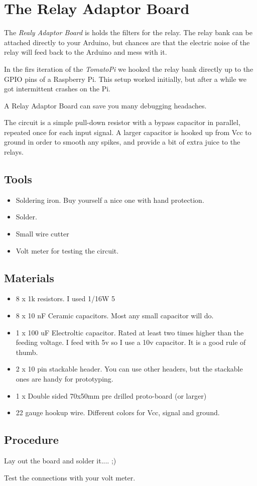 \documentclass{article} \usepackage{multicol}
\begin{document}
\section{The Relay Adaptor Board}
The \textit{Realy Adaptor Board} is holds the filters for the relay.
The relay bank can be attached directly to your Arduino, but chances
are that the electric noise of the relay will feed back to the Arduino
and mess with it.

In the firs iteration of the \textit{TomatoPi} we hooked the relay
bank directly up to the GPIO pins of a Raspberry Pi.  This setup
worked initially, but after a while we got intermittent crashes on the
Pi.

A Relay Adaptor Board can save you many debugging headaches.

The circuit is a simple pull-down resistor with a bypass capacitor in
parallel, repeated once for each input signal.  A larger capacitor is
hooked up from Vcc to ground in order to smooth any spikes, and
provide a bit of extra juice to the relays.

\begin{multicols}{2}
  \subsection{Tools}
  \begin{itemize}
  \item Soldering iron.  Buy yourself a nice one with hand protection.
  \item Solder.
  \item Small wire cutter
  \item Volt meter for testing the circuit.
  \end{itemize}

  \subsection{Materials}
  \begin{itemize}
  \item 8 x 1k resistors.  I used 1/16W 5%
  \item 8 x 10 nF Ceramic capacitors.  Most any small capacitor will
    do.
  \item 1 x 100 uF Electroltic capacitor. Rated at least two times
    higher than the feeding voltage.  I feed with 5v so I use a 10v
    capacitor.  It is a good rule of thumb.
  \item 2 x 10 pin stackable header.  You can use other headers, but
    the stackable ones are handy for prototyping.
  \item 1 x Double sided 70x50mm pre drilled proto-board (or larger)
  \item 22 gauge hookup wire. Different colors for Vcc, signal and
    ground.
  \end{itemize}

  \subsection{Procedure}
  Lay out the board and solder it.... ;)

  Test the connections with your volt meter.
\end{multicols}
\end{document}
